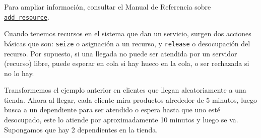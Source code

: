 \documentclass[
]{book}
\theoremstyle{definition}
\theoremstyle{definition}
\theoremstyle{definition}
\theoremstyle{definition}
\theoremstyle{remark}
\begin{document}
Para ampliar información, consultar el Manual de Referencia sobre \href{https://r-simmer.org/reference/add_resource.html}{\texttt{add\_resource}}.

Cuando tenemos recursos en el sistema que dan un servicio, surgen dos acciones básicas que son: \texttt{seize} o asignación a un recurso, y \texttt{release} o desocupación del recurso. Por supuesto, si una llegada no puede ser atendida por un servidor (recurso) libre, puede esperar en cola si hay hueco en la cola, o ser rechazada si no lo hay.

Transformemos el ejemplo anterior en clientes que llegan aleatoriamente a una tienda. Ahora al llegar, cada cliente mira productos alrededor de 5 minutos, luego busca a un dependiente para ser atendido o espera hasta que uno esté desocupado, este lo atiende por aproximadamente 10 minutos y luego se va. Supongamos que hay 2 dependientes en la tienda.
\end{document}
